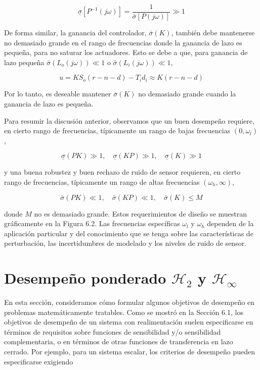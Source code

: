 $$
\underline{\sigma}\left[P^{-1}(j \omega)\right]=\frac{1}{\bar{\sigma}[P(j \omega)]} \gg 1
$$

De forma similar, la ganancia del controlador, $\bar{\sigma}(K)$, también debe mantenerse no demasiado grande en el rango de frecuencias donde la ganancia de lazo es pequeña, para no saturar los actuadores. Esto se debe a que, para ganancia de lazo pequeña $\bar{\sigma}\left(L_{o}(j \omega)\right) \ll 1$ o $\bar{\sigma}\left(L_{i}(j \omega)\right) \ll 1$,

$$
u=K S_{o}(r-n-d)-T_{i} d_{i} \approx K(r-n-d)
$$

Por lo tanto, es deseable mantener $\bar{\sigma}(K)$ no demasiado grande cuando la ganancia de lazo es pequeña.

Para resumir la discusión anterior, observamos que un buen desempeño requiere, en cierto rango de frecuencias, típicamente un rango de bajas frecuencias $\left(0, \omega_{l}\right)$,

$$
\underline{\sigma}(P K) \gg 1, \quad \underline{\sigma}(K P) \gg 1, \quad \underline{\sigma}(K) \gg 1
$$

y una buena robustez y buen rechazo de ruido de sensor requieren, en cierto rango de frecuencias, típicamente un rango de altas frecuencias $\left(\omega_{h}, \infty\right)$,

$$
\bar{\sigma}(P K) \ll 1, \quad \bar{\sigma}(K P) \ll 1, \quad \bar{\sigma}(K) \leq M
$$

donde $M$ no es demasiado grande. Estos requerimientos de diseño se muestran gráficamente en la Figura 6.2. Las frecuencias específicas $\omega_{l}$ y $\omega_{h}$ dependen de la aplicación particular y del conocimiento que se tenga sobre las características de perturbación, las incertidumbres de modelado y los niveles de ruido de sensor.


\section{Desempeño ponderado $\mathcal{H}_2$ y $\mathcal{H}_{\infty}$}
En esta sección, consideramos cómo formular algunos objetivos de desempeño en problemas matemáticamente tratables. Como se mostró en la Sección 6.1, los objetivos de desempeño de un sistema con realimentación suelen especificarse en términos de requisitos sobre funciones de sensibilidad y/o sensibilidad complementaria, o en términos de otras funciones de transferencia en lazo cerrado. Por ejemplo, para un sistema escalar, los criterios de desempeño pueden especificarse exigiendo

